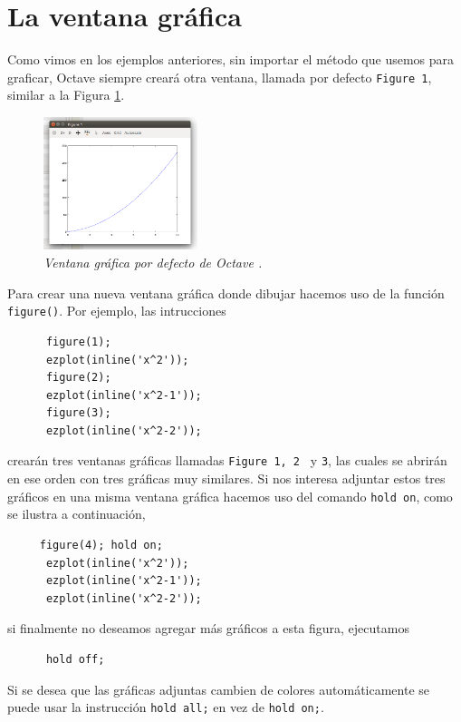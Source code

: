 \documentclass[letter,11pt]{article}
\newcommand\0{\mathbf{0}}
\newcommand{\octave}{{\sc Octave }}
\begin{document}
    \section{La ventana gr\'afica}
      Como vimos en los ejemplos anteriores, sin importar el m\'etodo que usemos para graficar, \octave siempre crear\'a otra ventana, llamada por defecto \texttt{Figure 1}, similar a la Figura \ref{fig:ventanagrafica}. 
      \begin{figure}[htp]
      \begin{center}
      \includegraphics[width=0.4\textwidth]{./ventanafigure.png}
      \caption{\sl Ventana gr\'afica por defecto de \octave.}
      \label{fig:ventanagrafica}
      \end{center}
      \end{figure}
     Para crear una nueva ventana gr\'afica donde dibujar hacemos uso de la funci\'on \texttt{figure()}. Por 
     ejemplo, las intrucciones
     \begin{lstlisting}
      figure(1);
      ezplot(inline('x^2'));
      figure(2);
      ezplot(inline('x^2-1'));
      figure(3);
      ezplot(inline('x^2-2'));
     \end{lstlisting}
     crear\'an tres ventanas gr\'aficas llamadas \texttt{Figure 1, 2 } y \texttt{3}, las cuales se abrir\'an 
     en ese orden con tres gr\'aficas muy similares.
     Si nos interesa adjuntar estos tres gr\'aficos en una misma ventana gr\'afica hacemos uso del 
     comando \texttt{hold on}, como se ilustra a continuaci\'on,
     \begin{lstlisting}
     figure(4); hold on;
      ezplot(inline('x^2'));
      ezplot(inline('x^2-1'));
      ezplot(inline('x^2-2'));
     \end{lstlisting}
     si finalmente no deseamos agregar m\'as gr\'aficos a esta figura, ejecutamos 
     \begin{verbatim}
      hold off;
     \end{verbatim}  
     Si se desea que las gr\'aficas adjuntas cambien de colores autom\'aticamente se puede usar la instrucci\'on \texttt{hold all;} en vez de \texttt{hold on;}.
     
\end{document}
